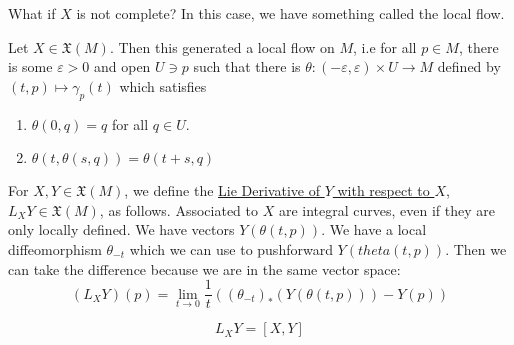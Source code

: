 \documentclass[x11names,reqno,14pt]{extarticle}
\newcommand{\mk}[1]{\mathfrak{#1}}
\begin{document}
What if $X$ is not complete? In this case, we have something called the local flow. 


Let $X \in \mk{X}(M)$. Then this generated a local flow on $M$, i.e for all $p \in M$, there is some $\varepsilon>0$ and open $U \ni p$ such that there is $\theta:(-\varepsilon,\varepsilon)\times U\to M$ defined by $(t, p) \mapsto \gamma_p(t)$ which satisfies
\begin{enumerate}

\item $\theta(0,q) = q$ for all $q \in U$. 

\item $\theta(t, \theta(s, q)) = \theta(t + s, q)$

\end{enumerate}


For $X, Y \in \mk{X}(M)$, we define the \underline{Lie Derivative of $Y$ with respect to $X$}, $L_XY \in \mk{X}(M)$, as follows. Associated to $X$ are integral curves, even if they are only locally defined. We have vectors $Y(\theta(t, p))$. We have a local diffeomorphism $\theta_{-t}$ which we can use to pushforward $Y(theta(t, p))$. Then we can take the difference because we are in the same vector space:
\[
(L_XY)(p) = \lim_{t\to0}\frac{1}{t}\left((\theta_{-t})_*(Y(\theta(t, p))) - Y(p) \right)
\]


\thm

\[
L_XY = [X,Y]
\]
\end{document}
